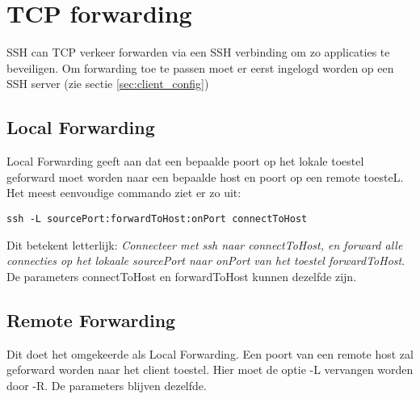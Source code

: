 \documentclass{report}
\begin{document}
	\section{TCP forwarding}
	SSH can TCP verkeer forwarden via een SSH verbinding om zo applicaties te beveiligen. Om forwarding toe te passen moet er eerst ingelogd worden op een SSH server (zie sectie \ref{sec:client_config})
	\subsection{Local Forwarding}
	Local Forwarding geeft aan dat een bepaalde poort op het lokale toestel geforward moet worden naar een bepaalde host en poort op een remote toesteL. Het meest eenvoudige commando ziet er zo uit:
	\begin{lstlisting}
ssh -L sourcePort:forwardToHost:onPort connectToHost
	\end{lstlisting}
	Dit betekent letterlijk: \textit{Connecteer met ssh naar connectToHost, en forward alle connecties op het lokaale sourcePort naar onPort van het toestel forwardToHost}. De parameters connectToHost en forwardToHost kunnen dezelfde zijn.	
	
	\subsection{Remote Forwarding}
	Dit doet het omgekeerde als Local Forwarding. Een poort van een remote host zal geforward worden naar het client toestel. Hier moet de optie -L vervangen worden door -R. De parameters blijven dezelfde.
\end{document}
